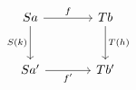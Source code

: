 \documentclass[border=6pt]{standalone}
\begin{document}
$
\begin{tikzcd}[column sep=large, row sep=large]
  Sa \arrow[r, "f"] \arrow[d, "S(k)"'] & Tb \arrow[d, "T(h)"] \\
  Sa' \arrow[r, "f'"'] & Tb'
\end{tikzcd}
$
\end{document}
